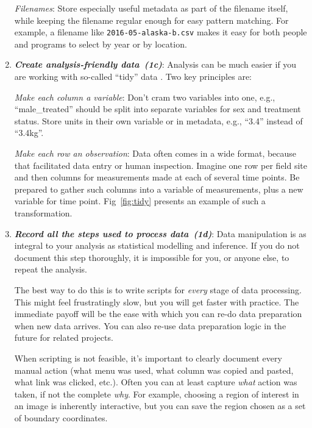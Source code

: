 \documentclass[10pt,letterpaper]{article}
\newcommand{\practice}[2]{\textbf{\emph{{#2}~({#1})}}}
\begin{document}
\begin{enumerate}
  \emph{Filenames}: Store especially useful metadata as part of the filename itself, while
  keeping the filename regular enough for easy pattern matching. For example, a filename
  like \texttt{2016-05-alaska-b.csv} makes it easy for both people and programs to select
  by year or by location.

\item
  \practice{1c}{Create analysis-friendly data}: Analysis can be much easier if you are
  working with so-called ``tidy'' data \cite{wickham2014}. Two key principles are:

  \emph{Make each column a variable}: Don't cram two variables into one, e.g.,
  ``male\_treated'' should be split into separate variables for sex and treatment status.
  Store units in their own variable or in metadata, e.g., ``3.4'' instead of ``3.4kg''.

  \emph{Make each row an observation}: Data often comes in a wide format, because that
  facilitated data entry or human inspection. Imagine one row per field site and then
  columns for measurements made at each of several time points. Be prepared to gather such
  columns into a variable of measurements, plus a new variable for time point.
  Fig~\ref{fig:tidy} presents an example of such a transformation.

\item
  \practice{1d}{Record all the steps used to process data}: Data manipulation is as integral
  to your analysis as statistical modelling and inference. If you do not document this
  step thoroughly, it is impossible for you, or anyone else, to repeat the analysis.

  The best way to do this is to write scripts for \emph{every} stage of data processing.
  This might feel frustratingly slow, but you will get faster with practice. The
  immediate payoff will be the ease with which you can re-do data preparation when new
  data arrives. You can also re-use data preparation logic in the future for related
  projects.

  When scripting is not feasible, it's important to clearly document every manual action
  (what menu was used, what column was copied and pasted, what link was clicked, etc.).
  Often you can at least capture \emph{what} action was taken, if not the complete
  \emph{why}. For example, choosing a region of interest in an image is inherently
  interactive, but you can save the region chosen as a set of boundary coordinates.


\end{enumerate}
\end{document}
